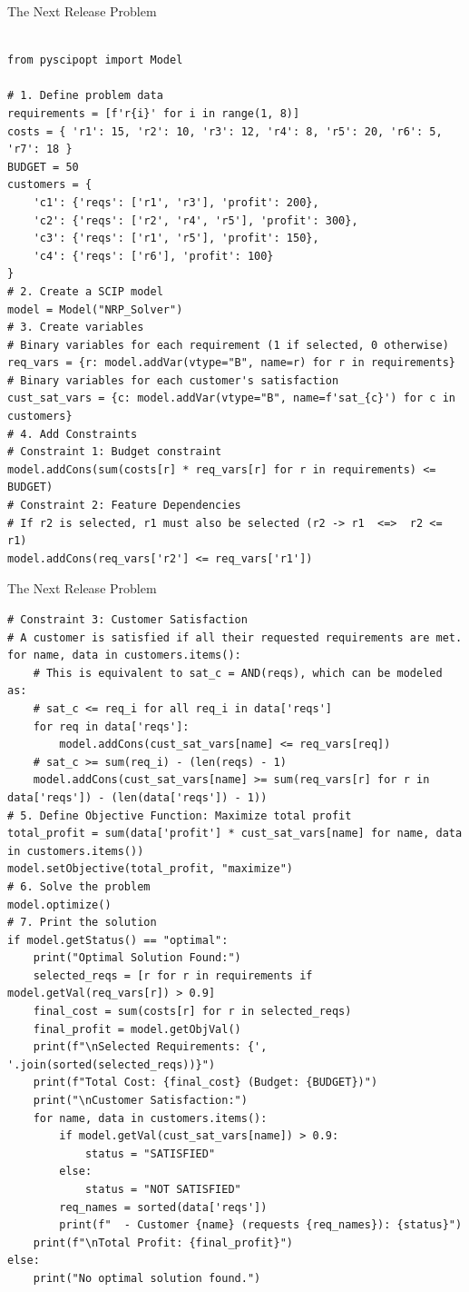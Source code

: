 \documentclass{beamer}
\begin{document}
\begin{frame}[t,fragile]{The Next Release Problem}
	\tiny
	\begin{verbatim}

from pyscipopt import Model

# 1. Define problem data
requirements = [f'r{i}' for i in range(1, 8)]
costs = { 'r1': 15, 'r2': 10, 'r3': 12, 'r4': 8, 'r5': 20, 'r6': 5, 'r7': 18 }
BUDGET = 50
customers = {
    'c1': {'reqs': ['r1', 'r3'], 'profit': 200},
    'c2': {'reqs': ['r2', 'r4', 'r5'], 'profit': 300},
    'c3': {'reqs': ['r1', 'r5'], 'profit': 150},
    'c4': {'reqs': ['r6'], 'profit': 100}
}
# 2. Create a SCIP model
model = Model("NRP_Solver")
# 3. Create variables
# Binary variables for each requirement (1 if selected, 0 otherwise)
req_vars = {r: model.addVar(vtype="B", name=r) for r in requirements}
# Binary variables for each customer's satisfaction
cust_sat_vars = {c: model.addVar(vtype="B", name=f'sat_{c}') for c in customers}
# 4. Add Constraints
# Constraint 1: Budget constraint
model.addCons(sum(costs[r] * req_vars[r] for r in requirements) <= BUDGET)
# Constraint 2: Feature Dependencies
# If r2 is selected, r1 must also be selected (r2 -> r1  <=>  r2 <= r1)
model.addCons(req_vars['r2'] <= req_vars['r1'])
\end{verbatim}
\end{frame}

\begin{frame}[t,fragile]{The Next Release Problem}
	\tiny
	\begin{verbatim}
# Constraint 3: Customer Satisfaction
# A customer is satisfied if all their requested requirements are met.
for name, data in customers.items():
    # This is equivalent to sat_c = AND(reqs), which can be modeled as:
    # sat_c <= req_i for all req_i in data['reqs']
    for req in data['reqs']:
        model.addCons(cust_sat_vars[name] <= req_vars[req])
    # sat_c >= sum(req_i) - (len(reqs) - 1)
    model.addCons(cust_sat_vars[name] >= sum(req_vars[r] for r in data['reqs']) - (len(data['reqs']) - 1))
# 5. Define Objective Function: Maximize total profit
total_profit = sum(data['profit'] * cust_sat_vars[name] for name, data in customers.items())
model.setObjective(total_profit, "maximize")
# 6. Solve the problem
model.optimize()
# 7. Print the solution
if model.getStatus() == "optimal":
    print("Optimal Solution Found:")
    selected_reqs = [r for r in requirements if model.getVal(req_vars[r]) > 0.9]
    final_cost = sum(costs[r] for r in selected_reqs)
    final_profit = model.getObjVal()
    print(f"\nSelected Requirements: {', '.join(sorted(selected_reqs))}")
    print(f"Total Cost: {final_cost} (Budget: {BUDGET})")
    print("\nCustomer Satisfaction:")
    for name, data in customers.items():
        if model.getVal(cust_sat_vars[name]) > 0.9:
            status = "SATISFIED"
        else:
            status = "NOT SATISFIED"
        req_names = sorted(data['reqs'])
        print(f"  - Customer {name} (requests {req_names}): {status}")
    print(f"\nTotal Profit: {final_profit}")
else:
    print("No optimal solution found.")
\end{verbatim}

	
\end{frame}
\end{document}
